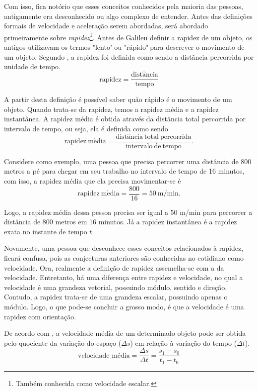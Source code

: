 \documentclass[
	12pt,				%
	openright,			%
    twoside,			%
	a4paper,			%
	chapter=TITLE,		%
	english,			%
	french,				%
	spanish,			%
	brazil				%
	]{abntex2}
\numberwithin{lema}{chapter}
\numberwithin{teorema}{chapter}
\numberwithin{definicao}{chapter}
\numberwithin{exemplo}{chapter}
\numberwithin{figure}{chapter}
\begin{document}
Com isso, fica notório que esses conceitos conhecidos pela maioria das pessoas, antigamente era desconhecido ou algo complexo de entender. Antes das definições formais de velocidade e aceleração serem abordadas, será abordado primeiramente sobre \textit{rapidez}\footnote{Também conhecida como velocidade escalar.}. Antes de Galileu definir a rapidez de um objeto, os antigos utilizavam os termos "lento"$ \ $ou "rápido"$ \ $para descrever o movimento de um objeto. Segundo , a rapidez foi definida como sendo a distância percorrida por unidade de tempo. 
$$\mathrm{rapidez = \dfrac{dist \hat{a}ncia}{tempo}}$$

A partir desta definição é possível saber quão rápido é o movimento de um objeto. Quando trata-se da rapidez, temos a rapidez média e a rapidez instantânea. A rapidez média é obtida através da distância total percorrida por intervalo de tempo, ou seja, ela é definida como sendo
$$\mathrm{rapidez \ m \acute{e}dia= \dfrac{dist \hat{a}ncia \ total \ percorrida}{intervalo \ de \ tempo}.}$$

Considere como exemplo, uma pessoa que precisa percorrer uma distância de 800 metros a pé para chegar em seu trabalho no intervalo de tempo de 16 minutos, com isso, a rapidez média que ela precisa movimentar-se é
$$ \mathrm{rapidez \ m \acute{e}dia = \dfrac{800}{16} = 50 \ m/min.}$$

Logo, a rapidez média dessa pessoa precisa ser igual a 50 m/min para percorrer a distância de 800 metros em 16 minutos. Já a rapidez instantânea é a rapidez exata no instante de tempo $t$.

Novamente, uma pessoa que desconhece esses conceitos relacionados à rapidez, ficará confusa, pois as conjecturas anteriores são conhecidas no cotidiano como velocidade. Ora, realmente a definição de rapidez assemelha-se com a da velocidade. Entretanto, há uma diferença entre rapidez e velocidade, no qual a velocidade é uma grandeza vetorial, possuindo módulo, sentido e direção. Contudo, a rapidez trata-se de uma grandeza escalar, possuindo apenas o módulo. Logo, o que pode-se concluir a grosso modo, é que a velocidade é uma rapidez com orientação. 

De acordo com , a velocidade média de um determinado objeto pode ser obtida pelo quociente da variação do espaço ($\Delta s$) em relação à variação do tempo ($\Delta t$).
\begin{equation}
	\label{velocidade_media}
	\text{velocidade média} = \dfrac{\Delta s}{\Delta t} = \dfrac{s_1 - s_0}{t_1 - t_0}
\end{equation}
\end{document}
